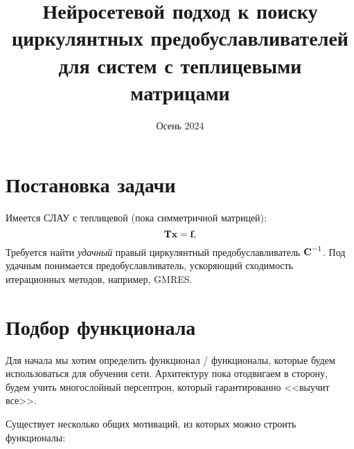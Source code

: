\documentclass[a4paper, 12pt]{article}
\begin{document}
\title{Нейросетевой подход к поиску\\ циркулянтных предобуславливателей \\для систем с теплицевыми матрицами}
\date{Осень 2024}

\maketitle

\tableofcontents

\section{Постановка задачи}

Имеется СЛАУ с теплицевой (пока симметричной матрицей):
\[
    \textbf T\textbf x = \textbf f,
\]
Требуется найти \textit{удачный} правый циркулянтный 
предобуславливатель $\textbf C^{-1}$.
Под удачным понимается предобуславливатель, ускоряющий сходимость
итерационных методов, например, GMRES.

\section{Подбор функционала}

Для начала мы хотим определить функционал / функционалы, которые будем использоваться для обучения сети.
Архитектуру пока отодвигаем в сторону, будем учить многослойный персептрон, который
гарантированно <<выучит все>>. 

Существует несколько общих мотиваций, из которых можно строить функционалы:
\end{document}
